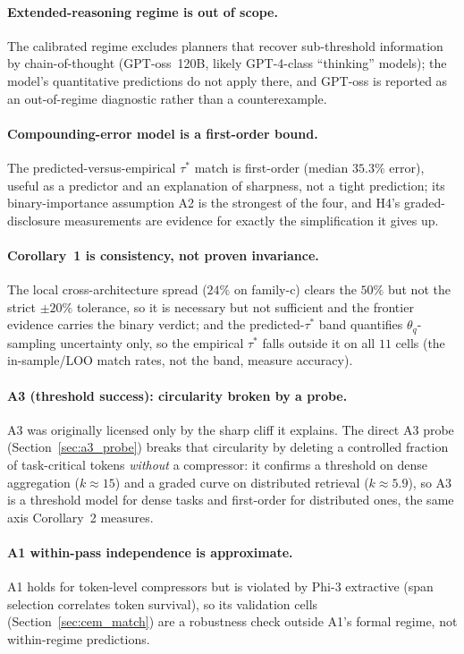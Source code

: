 \paragraph{Extended-reasoning regime is out of scope.}
The calibrated regime excludes planners that recover sub-threshold
information by chain-of-thought (GPT-oss~120B, likely GPT-4-class
``thinking'' models); the model's quantitative predictions do not
apply there, and GPT-oss is reported as an out-of-regime diagnostic
rather than a counterexample.

\paragraph{Compounding-error model is a first-order bound.}
The predicted-versus-empirical $\tau^{*}$ match is first-order
(median $35.3\%$ error), useful as a predictor and an explanation of
sharpness, not a tight prediction; its binary-importance assumption
A2 is the strongest of the four, and H4's graded-disclosure
measurements are evidence for exactly the simplification it gives up.

\paragraph{Corollary~1 is consistency, not proven invariance.}
The local cross-architecture spread ($24\%$ on family-c) clears the
$50\%$ but not the strict $\pm20\%$ tolerance, so it is necessary but
not sufficient and the frontier evidence carries the binary verdict;
and the predicted-$\tau^{*}$ band quantifies $\theta_q$-sampling
uncertainty only, so the empirical $\tau^{*}$ falls outside it on all
$11$ cells (the in-sample/LOO match rates, not the band, measure
accuracy).

\paragraph{A3 (threshold success): circularity broken by a probe.}
A3 was originally licensed only by the sharp cliff it explains. The
direct A3 probe (Section~\ref{sec:a3_probe}) breaks that circularity
by deleting a controlled fraction of task-critical tokens
\emph{without} a compressor: it confirms a threshold on dense
aggregation ($k\approx15$) and a graded curve on distributed
retrieval ($k\approx5.9$), so A3 is a threshold model for dense tasks
and first-order for distributed ones, the same axis Corollary~2
measures.

\paragraph{A1 within-pass independence is approximate.}
A1 holds for token-level compressors but is violated by Phi-3
extractive (span selection correlates token survival), so its
validation cells (Section~\ref{sec:cem_match}) are a robustness check
outside A1's formal regime, not within-regime predictions.


